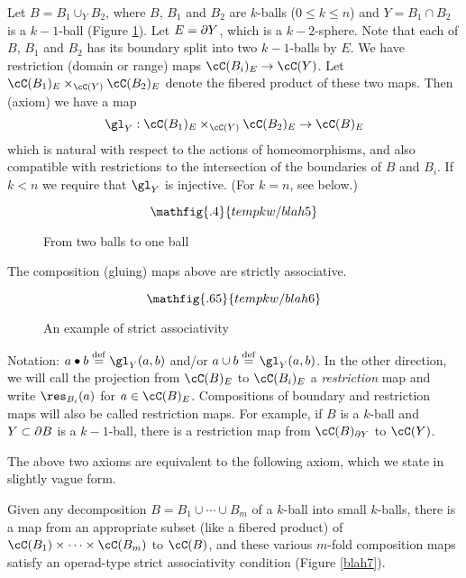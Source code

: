 \begin{axiom}[Composition]
Let $B = B_1 \cup_Y B_2$, where $B$, $B_1$ and $B_2$ are $k$-balls ($0\le k\le n$)
and $Y = B_1\cap B_2$ is a $k{-}1$-ball (Figure \ref{blah5}).
Let $E = \partial Y$, which is a $k{-}2$-sphere.
Note that each of $B$, $B_1$ and $B_2$ has its boundary split into two $k{-}1$-balls by $E$.
We have restriction (domain or range) maps $\cC(B_i)_E \to \cC(Y)$.
Let $\cC(B_1)_E \times_{\cC(Y)} \cC(B_2)_E$ denote the fibered product of these two maps. 
Then (axiom) we have a map
\[
	\gl_Y : \cC(B_1)_E \times_{\cC(Y)} \cC(B_2)_E \to \cC(B)_E
\]
which is natural with respect to the actions of homeomorphisms, and also compatible with restrictions
to the intersection of the boundaries of $B$ and $B_i$.
If $k < n$ we require that $\gl_Y$ is injective.
(For $k=n$, see below.)
\end{axiom}

\begin{figure}[!ht]
$$\mathfig{.4}{tempkw/blah5}$$
\caption{From two balls to one ball}\label{blah5}\end{figure}

\begin{axiom}
The composition (gluing) maps above are strictly associative.
\end{axiom}

\begin{figure}[!ht]
$$\mathfig{.65}{tempkw/blah6}$$
\caption{An example of strict associativity}\label{blah6}\end{figure}

Notation: $a\bullet b \deq \gl_Y(a, b)$ and/or $a\cup b \deq \gl_Y(a, b)$.
In the other direction, we will call the projection from $\cC(B)_E$ to $\cC(B_i)_E$ 
a {\it restriction} map and write $\res_{B_i}(a)$ for $a\in \cC(B)_E$.
Compositions of boundary and restriction maps will also be called restriction maps.
For example, if $B$ is a $k$-ball and $Y\subset \partial B$ is a $k{-}1$-ball, there is a
restriction map from $\cC(B)_{\bd Y}$ to $\cC(Y)$.


The above two axioms are equivalent to the following axiom,
which we state in slightly vague form.

{Given any decomposition $B = B_1\cup\cdots\cup B_m$ of a $k$-ball
into small $k$-balls, there is a 
map from an appropriate subset (like a fibered product) 
of $\cC(B_1)\times\cdots\times\cC(B_m)$ to $\cC(B)$,
and these various $m$-fold composition maps satisfy an
operad-type strict associativity condition (Figure \ref{blah7}).}

